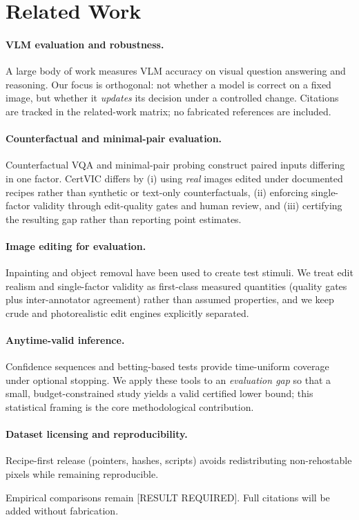 \section{Related Work}

\paragraph{VLM evaluation and robustness.} A large body of work measures VLM
accuracy on visual question answering and reasoning. Our focus is orthogonal:
not whether a model is correct on a fixed image, but whether it \emph{updates}
its decision under a controlled change. Citations are tracked in the
related-work matrix; no fabricated references are included.

\paragraph{Counterfactual and minimal-pair evaluation.} Counterfactual VQA and
minimal-pair probing construct paired inputs differing in one factor. CertVIC
differs by (i) using \emph{real} images edited under documented recipes rather
than synthetic or text-only counterfactuals, (ii) enforcing single-factor
validity through edit-quality gates and human review, and (iii) certifying the
resulting gap rather than reporting point estimates.

\paragraph{Image editing for evaluation.} Inpainting and object removal have been
used to create test stimuli. We treat edit realism and single-factor validity as
first-class measured quantities (quality gates plus inter-annotator agreement)
rather than assumed properties, and we keep crude and photorealistic edit engines
explicitly separated.

\paragraph{Anytime-valid inference.} Confidence sequences and betting-based tests
provide time-uniform coverage under optional stopping. We apply these tools to an
\emph{evaluation gap} so that a small, budget-constrained study yields a valid
certified lower bound; this statistical framing is the core methodological
contribution.

\paragraph{Dataset licensing and reproducibility.} Recipe-first release (pointers,
hashes, scripts) avoids redistributing non-rehostable pixels while remaining
reproducible.

Empirical comparisons remain [RESULT REQUIRED]. Full citations will be added
without fabrication.
